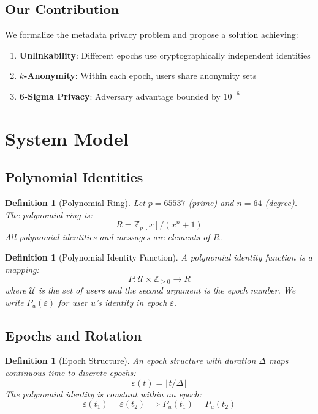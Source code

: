 \documentclass[11pt]{article}
\newtheorem{definition}[theorem]{Definition}
\newcommand{\Ring}{\mathbb{Z}_p[x]/(x^n+1)}
\newcommand{\epoch}{\varepsilon}
\begin{document}
\subsection{Our Contribution}

We formalize the metadata privacy problem and propose a solution achieving:
\begin{enumerate}
    \item \textbf{Unlinkability}: Different epochs use cryptographically independent identities
    \item \textbf{$k$-Anonymity}: Within each epoch, users share anonymity sets
    \item \textbf{6-Sigma Privacy}: Adversary advantage bounded by $10^{-6}$
\end{enumerate}

\section{System Model}

\subsection{Polynomial Identities}

\begin{definition}[Polynomial Ring]
Let $p = 65537$ (prime) and $n = 64$ (degree). The polynomial ring is:
\[
R = \Ring
\]
All polynomial identities and messages are elements of $R$.
\end{definition}

\begin{definition}[Polynomial Identity Function]
A \emph{polynomial identity function} is a mapping:
\[
P : \mathcal{U} \times \mathbb{Z}_{\geq 0} \to R
\]
where $\mathcal{U}$ is the set of users and the second argument is the epoch number.
We write $P_u(\epoch)$ for user $u$'s identity in epoch $\epoch$.
\end{definition}

\subsection{Epochs and Rotation}

\begin{definition}[Epoch Structure]
An \emph{epoch structure} with duration $\Delta$ maps continuous time to discrete epochs:
\[
\epoch(t) = \lfloor t / \Delta \rfloor
\]
The polynomial identity is constant within an epoch:
\[
\epoch(t_1) = \epoch(t_2) \implies P_u(t_1) = P_u(t_2)
\]
\end{definition}
\end{document}
